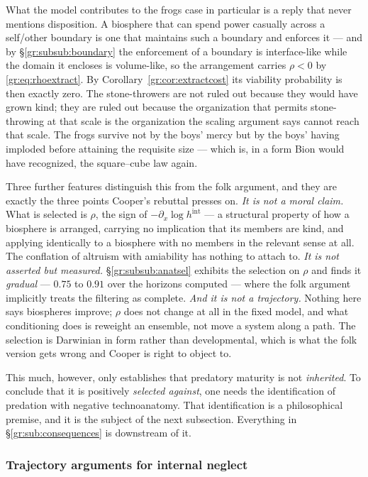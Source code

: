 \documentclass[11pt]{article}
\numberwithin{equation}{section}
\theoremstyle{plain}
\theoremstyle{definition}
\theoremstyle{remark}
\begin{document}
What the model contributes to the frogs case in particular is a reply
that never mentions disposition. A biosphere that can spend power
casually across a self/other boundary is one that maintains such a
boundary and enforces it --- and by \S\ref{gr:subsub:boundary} the
enforcement of a boundary is interface-like while the domain it encloses
is volume-like, so the arrangement carries $\rho<0$ by
\eqref{gr:eq:rhoextract}. By Corollary~\ref{gr:cor:extractcost} its
viability probability is then exactly zero. The stone-throwers are not
ruled out because they would have grown kind; they are ruled out
because the organization that permits stone-throwing at that scale is
the organization the scaling argument says cannot reach that scale. The
frogs survive not by the boys' mercy but by the boys' having imploded
before attaining the requisite size --- which is, in a form Bion would
have recognized, the square--cube law again.

Three further features distinguish this from the folk argument, and they
are exactly the three points Cooper's rebuttal presses on. \emph{It is not
a moral claim.} What is selected is $\rho$, the sign of
$-\partial_x\log h^{\mathrm{int}}$ --- a structural property of how a
biosphere is arranged, carrying no implication that its members are
kind, and applying identically to a biosphere with no members in the
relevant sense at all. The conflation of altruism with amiability has
nothing to attach to. \emph{It is not asserted but measured.}
\S\ref{gr:subsub:anatsel} exhibits the selection on $\rho$ and finds it
\emph{gradual} --- $0.75$ to $0.91$ over the horizons computed ---
where the folk argument implicitly treats the filtering as complete.
\emph{And it is not a trajectory.} Nothing here says biospheres improve;
$\rho$ does not change at all in the fixed model, and what conditioning
does is reweight an ensemble, not move a system along a path. The
selection is Darwinian in form rather than developmental, which is
what the folk version gets wrong and Cooper is right to object to.

This much, however, only establishes that predatory maturity is not
\emph{inherited}. To conclude that it is positively \emph{selected
against}, one needs the identification of predation with negative
technoanatomy. That identification is a philosophical premise, and it is
the subject of the next subsection. Everything in
\S\ref{gr:sub:consequences} is downstream of it.

\subsubsection{Trajectory arguments for internal neglect}
\label{gr:subsub:neglect}
\end{document}
